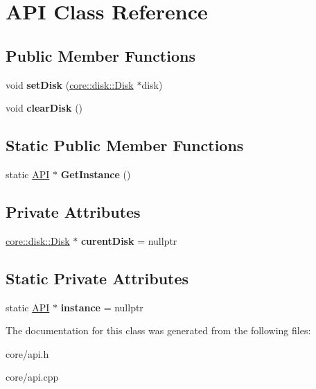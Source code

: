 \hypertarget{class_a_p_i}{}\section{A\+PI Class Reference}
\label{class_a_p_i}
\subsection*{Public Member Functions}
\begin{DoxyCompactItemize}
\item 
\mbox{\label{class_a_p_i_a730e235552b5186f55b27e23a5e17619}} 
void {\bfseries set\+Disk} (\mbox{\hyperlink{classcore_1_1disk_1_1_disk}{core\+::disk\+::\+Disk}} $\ast$disk)
\item 
\mbox{\label{class_a_p_i_a8b93e32e326debdb0a1e8de4b1ce1668}} 
void {\bfseries clear\+Disk} ()
\end{DoxyCompactItemize}
\subsection*{Static Public Member Functions}
\begin{DoxyCompactItemize}
\item 
\mbox{\label{class_a_p_i_ababc5204ed8b36e639fdcc08f56b6500}} 
static \mbox{\hyperlink{class_a_p_i}{A\+PI}} $\ast$ {\bfseries Get\+Instance} ()
\end{DoxyCompactItemize}
\subsection*{Private Attributes}
\begin{DoxyCompactItemize}
\item 
\mbox{\label{class_a_p_i_a397024852bd14301a090c2f781fa0030}} 
\mbox{\hyperlink{classcore_1_1disk_1_1_disk}{core\+::disk\+::\+Disk}} $\ast$ {\bfseries curent\+Disk} = nullptr
\end{DoxyCompactItemize}
\subsection*{Static Private Attributes}
\begin{DoxyCompactItemize}
\item 
\mbox{\label{class_a_p_i_a5b39b78006c8a87015c3779001f29f89}} 
static \mbox{\hyperlink{class_a_p_i}{A\+PI}} $\ast$ {\bfseries instance} = nullptr
\end{DoxyCompactItemize}


The documentation for this class was generated from the following files\+:\begin{DoxyCompactItemize}
\item 
core/api.\+h\item 
core/api.\+cpp\end{DoxyCompactItemize}
